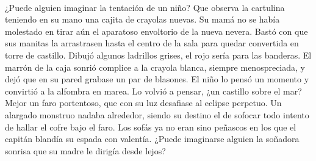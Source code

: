 \\[0.1cm]

¿Puede alguien imaginar la tentación de un niño? Que observa la cartulina teniendo en su mano una cajita de crayolas nuevas. Su mamá no se había molestado en tirar aún el aparatoso envoltorio de la nueva nevera. Bastó con que sus manitas la arrastrasen hasta el centro de la sala para quedar convertida en torre de castillo. Dibujó algunos ladrillos grises, el rojo sería para las banderas. El marrón de la caja sonrió complice a la crayola blanca, siempre menospreciada, y dejó que en su pared grabase un par de blasones. El niño lo pensó un momento y convirtió a la alfombra en marea. Lo volvió a pensar, ¿un castillo sobre el mar? Mejor un faro portentoso, que con su luz desafiase al eclipse perpetuo. Un alargado monstruo nadaba alrededor, siendo su destino el de sofocar todo intento de hallar el cofre bajo el faro. Los sofás ya no eran sino peñascos en los que el capitán blandía su espada con valentía. ¿Puede imaginarse alguien la soñadora sonrisa que su madre le dirigía desde lejos?
\\[0.5cm]

